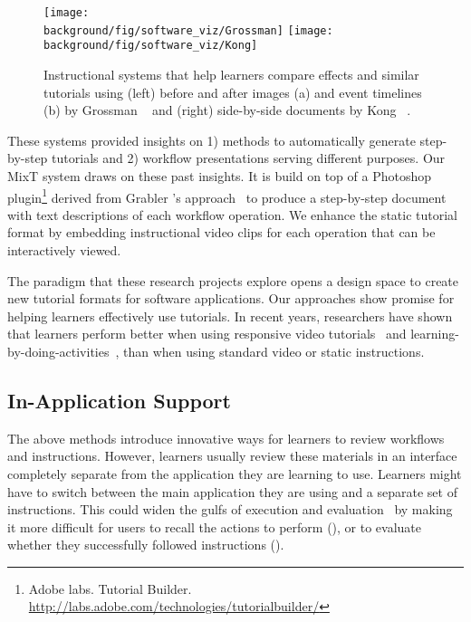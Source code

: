 \begin{figure*}[t!]
  \centering
  \texttt{[image: \\background/fig/software\_viz/Grossman]}
  \texttt{[image: \\background/fig/software\_viz/Kong]}
  \caption{Instructional systems that help learners compare effects and similar tutorials using (left) before and after images (a) and event timelines (b) by Grossman \ea{}~\cite{Grossman:2010jz} and (right) side-by-side documents by Kong \ea{}~\cite{Kong:2012:DTR:2207676.2208549}.}
  \label{fig:related_comparison}
\end{figure*}

These systems provided insights on 1) methods to automatically generate step-by-step tutorials and 2) workflow presentations serving different purposes.
%
Our MixT system draws on these past insights. It is build on top of a Photoshop plugin\footnote{Adobe labs. Tutorial Builder. \url{http://labs.adobe.com/technologies/tutorialbuilder/}} derived from Grabler \ea{}'s approach~\cite{Grabler:2009jj} to produce a step-by-step document with text descriptions of each workflow operation. We enhance the static tutorial format by embedding instructional video clips for each operation that can be interactively viewed.

The paradigm that these research projects explore opens a design space to create new tutorial formats for software applications. Our approaches show promise for helping learners effectively use tutorials. In recent years, researchers have shown that learners perform better when using responsive video tutorials~\cite{Nguyen:2015:MST:2702123.2702209} and learning-by-doing-activities~\cite{Kwon:2016:CEO:2858036.2858101}, than when using standard video or static instructions.


\subsection{In-Application Support}

The above methods introduce innovative ways for learners to review workflows and instructions. However, learners usually review these materials in an interface completely separate from the application they are learning to use. Learners might have to switch between the main application they are using and a separate set of instructions. This could widen the gulfs of execution and evaluation~\cite{Hutchins:1985:DMI:1453233.1453235} by making it more difficult for users to recall the actions to perform (), or to evaluate whether they successfully followed instructions ().

